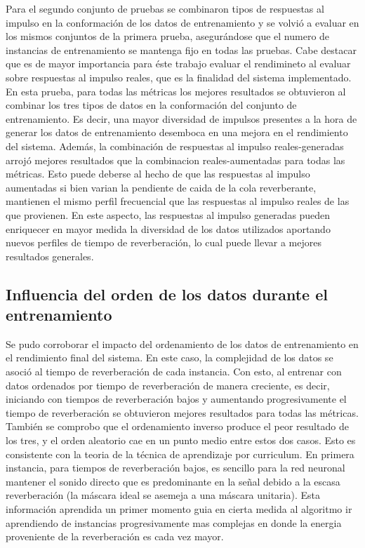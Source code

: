 Para el segundo conjunto de pruebas se combinaron tipos de respuestas al impulso en la conformación de los datos de entrenamiento y se volvió a evaluar en los mismos conjuntos de la primera prueba, asegurándose que el numero de instancias de entrenamiento se mantenga fijo en todas las pruebas. Cabe destacar que es de mayor importancia para éste trabajo evaluar el rendimineto al evaluar sobre respuestas al impulso reales, que es la finalidad del sistema implementado. En esta prueba, para todas las métricas los mejores resultados se obtuvieron al combinar los tres tipos de datos en la conformación del conjunto de entrenamiento. Es decir, una mayor diversidad de impulsos presentes a la hora de generar los datos de entrenamiento desemboca en una mejora en el rendimiento del sistema. Además, la combinación de respuestas al impulso reales-generadas arrojó mejores resultados que la combinacion reales-aumentadas para todas las métricas. Esto puede deberse al hecho de que las respuestas al impulso aumentadas si bien varian la pendiente de caida de la cola reverberante, mantienen el mismo perfil frecuencial que las respuestas al impulso reales de las que provienen. En este aspecto, las respuestas al impulso generadas pueden enriquecer en mayor medida la diversidad de los datos utilizados aportando nuevos perfiles de tiempo de reverberación, lo cual puede llevar a mejores resultados generales. 

\subsection{Influencia del orden de los datos durante el entrenamiento}
Se pudo corroborar el impacto del ordenamiento de los datos de entrenamiento en el rendimiento final del sistema. En este caso, la complejidad de los datos se asoció al tiempo de reverberación de cada instancia. Con esto, al entrenar con datos ordenados por tiempo de reverberación de manera creciente, es decir, iniciando con tiempos de reverberación bajos y aumentando progresivamente el tiempo de reverberación se obtuvieron mejores resultados para todas las métricas. También se comprobo que el ordenamiento inverso produce el peor resultado de los tres, y el orden aleatorio cae en un punto medio entre estos dos casos. Esto es consistente con la teoria de la técnica de aprendizaje por curriculum. En primera instancia, para tiempos de reverberación bajos, es sencillo para la red neuronal mantener el sonido directo que es predominante en la señal debido a la escasa reverberación (la máscara ideal se asemeja a una máscara unitaria). Esta información aprendida un primer momento guia en cierta medida al algoritmo ir aprendiendo de instancias progresivamente mas complejas en donde la energia proveniente de la reverberación es cada vez mayor. 
